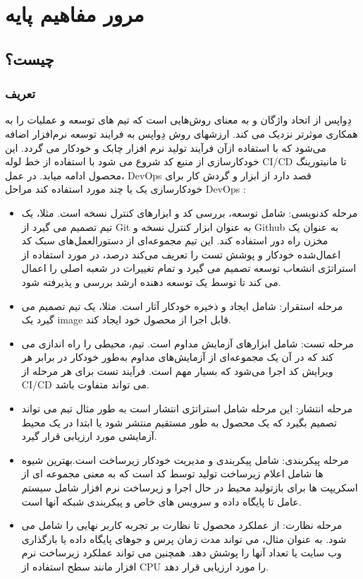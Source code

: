 \chapter{مرور مفاهیم پایه}

\section[مرو مفاهیم پایه]{ چیست؟}

\subsection{تعریف}
دِواپس از اتحاد واژگان 
 و
به معنای روش‌هایی است که تیم های توسعه و عملیات را به همکاری موثرتر نزدیک می کند. ارزشهای روش دِواپس به فرایند توسعه نرم‌افزار  اضافه می‌شود که با استفاده ازآن فرآیند تولید نرم افزار چابک و خودکار می گردد. این خودکارسازی از منبع کد شروع می شود با استفاده از خط لوله CI/CD  تا مانیتورینگ محصول ادامه میابد.
در عمل، DevOps قصد دارد از ابزار و گردش کار برای خودکارسازی یک یا چند مورد استفاده کند مراحل DevOps : 
\begin{itemize}
	\item
مرحله کدنویسی: شامل توسعه، بررسی کد و ابزارهای کنترل نسخه است. مثلا، یک تیم تصمیم می گیرد از Git به عنوان ابزار کنترل نسخه و Github به عنوان یک مخزن راه دور استفاده کند. این تیم مجموعه‌ای از دستورالعمل‌های سبک کد اعمال‌شده خودکار و پوشش تست را تعریف می‌کند درصد، در مورد استفاده از استراتژی انشعاب توسعه تصمیم می گیرد و تمام تغییرات در شعبه اصلی را اعمال می کند تا توسط یک توسعه دهنده ارشد بررسی و پذیرفته شود.
	\item 
مرحله استقرار: شامل ایجاد و ذخیره خودکار آثار است. مثلا، یک تیم تصمیم می گیرد یک image قابل اجرا از محصول خود ایجاد کند.
	\item 
مرحله تست: شامل ابزارهای آزمایش مداوم است. تیم، محیطی را راه اندازی می کند که در آن یک مجموعه‌ای از آزمایش‌های مداوم به‌طور خودکار در برابر هر ویرایش کد اجرا می‌شود که بسیار مهم است. فرآیند تست برای هر مرحله از CI/CD می تواند متفاوت باشد.
	\item 
مرحله انتشار: این مرحله شامل استراتژی انتشار است به طور مثال تیم می تواند تصمیم بگیرد که یک محصول به طور مستقیم منتشر شود یا ابتدا در یک محیط آزمایشی مورد ارزیابی قرار گیرد.
	\item 
مرحله پیکربندی: شامل پیکربندی و مدیریت خودکار زیرساخت است.بهترین شیوه ها شامل اعلام زیرساخت تولید توسط کد است که به معنی مجموعه ای از اسکریپت ها برای بازتولید محیط در حال اجرا و زیرساخت نرم افزار شامل سیستم عامل تا پایگاه داده  و سرویس های خاص و پیکربندی شبکه آنها است.
	\item 
مرحله نظارت: از عملکرد محصول تا نظارت بر تجربه کاربر نهایی را شامل می شود. به عنوان مثال، می تواند مدت زمان پرس و جوهای پایگاه داده یا بارگذاری وب سایت یا تعداد آنها را پوشش دهد. همچنین می تواند عملکرد زیرساخت نرم افزار مانند سطح استفاده از CPU را مورد ارزیابی قرار دهد.
\end{itemize}
